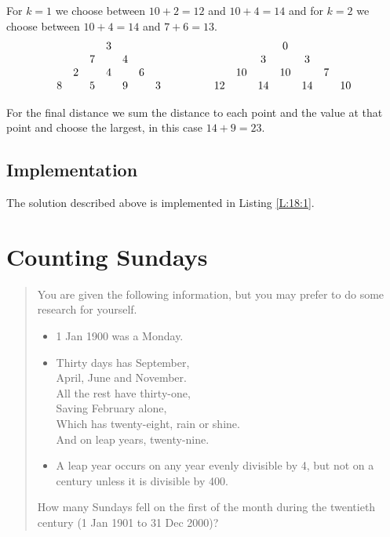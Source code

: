 \documentclass[oneside,12pt]{book}   	%
\newcounter{ex}
\newcounter{pr}
\theoremstyle{definition}
\begin{document}
\begin{spacing}{1.618}
			For $k=1$ we choose between $10+2=12$ and $10+4=14$ and for $k=2$ we choose between $10+4=14$ and $7+6=13$. 
			\begin{alignat}{4}
				\begin{array}{ccccccc}
					&&&{3}&&& \\
					&&{7}&& 4&& \\
					&2&&{4}&& 6& \\
					8 && 5 && {9} && 3
				\end{array} &\hspace{1 cm}&\begin{array}{ccccccc}
					&&& 0 \\
					&& 3 && 3\\
					& 10 & &10 & & 7 \\
					12 &&14&&14& &10 
				\end{array}
			\end{alignat}

			For the final distance we sum the distance to each point and the value at that point and choose the largest, in this case $14+9=23$. 
		\section{Implementation} \label{C:18:Implementation}

			The solution described above is implemented in Listing \ref{L:18:1}. 		
			

	\chapter{Counting Sundays}
	
		\begin{quote}
			You are given the following information, but you may prefer to do some research for yourself.

			\begin{itemize}
				\item 1 Jan 1900 was a Monday.
				\item Thirty days has September, \\
					April, June and November. \\
					All the rest have thirty-one, \\
					Saving February alone, \\
					Which has twenty-eight, rain or shine. \\
					And on leap years, twenty-nine.
				\item A leap year occurs on any year evenly divisible by 4, but not on a century unless it is divisible by 400.
			\end{itemize}
How many Sundays fell on the first of the month during the twentieth century (1 Jan 1901 to 31 Dec 2000)?
		\end{quote}


\end{spacing}
\end{document}
